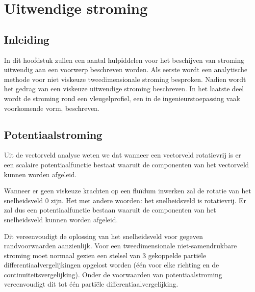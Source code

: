 \chapter{Uitwendige stroming}
\label{sec:Uitwendige stroming}

	\section{Inleiding}
	\label{sec:Uitwendige stroming Inleiding}
In dit hoofdstuk zullen een aantal hulpiddelen voor het beschijven van stroming uitwendig aan een voorwerp beschreven worden. Als eerste wordt een analytische methode voor niet viskeuze tweedimensionale stroming besproken. Nadien wordt het gedrag van een viskeuze uitwendige stroming beschreven. In het laatste deel wordt de stroming rond een vleugelprofiel, een in de ingenieurstoepassing vaak voorkomende vorm, beschreven.

	\section{Potentiaalstroming}
	\label{sec:Potentiaalstroming}

Uit de vectorveld analyse weten we dat wanneer een vectorveld rotatievrij is er een scalaire potentiaalfunctie bestaat waaruit de componenten van het vectorveld kunnen worden afgeleid.

Wanneer er geen viskeuze krachten op een fluïdum inwerken zal de rotatie van het snelheidsveld $0$ zijn. Het met andere woorden: het snelheidsveld is rotatievrij. Er zal dus een potentiaalfunctie bestaan waaruit de componenten van het snelheidsveld kunnen worden afgeleid.

Dit vereenvoudigt de oplossing van het snelheidsveld voor gegeven randvoorwaarden aanzienlijk. Voor een tweedimensionale niet-samendrukbare stroming moet normaal gezien een stelsel van 3 gekoppelde partiële differentiaalvergelijkingen opgelost worden (één voor elke richting en de continuïteitsvergelijking). Onder de voorwaarden van potentiaalstroming vereenvoudigt dit tot één partiële differentiaalvergelijking.

